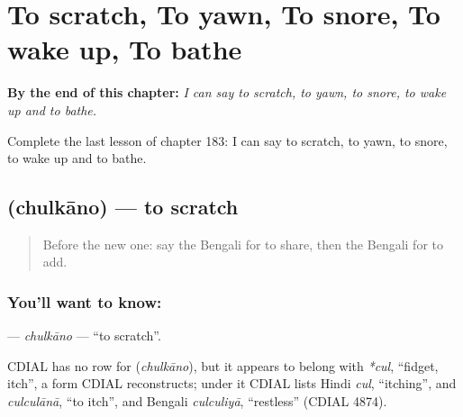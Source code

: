 
\chapter{To scratch, To yawn, To snore, To wake up, To bathe}
\label{ch:bn-to-scratch-to-yawn-to-snore-to-wake-up-to-bathe}

\begin{chapteropening}
\textbf{By the end of this chapter:} \emph{I can say to scratch, to yawn, to snore, to wake up and to bathe.}

Complete the last lesson of chapter 183: I can say to scratch, to yawn, to snore, to wake up and to bathe.
\end{chapteropening}

\section[\texorpdfstring{\bn{চুলকানো} (chulkāno)}{চুলকানো (chulkāno)}]{ (chulkāno) — to scratch}

\label{lesson:BN-C183-chulkano}



\begin{quote}
Before the new one: say the Bengali for to share, then the Bengali for to add.
\end{quote}

\subsection*{You'll want to know: }
\textbf{} — \emph{chulkāno} — \textquotedblleft{}to scratch\textquotedblright{}.

\begin{cousinweb}
CDIAL has no row for \textbf{} (\emph{chulkāno}), but it appears to belong with \emph{*cul}, \textquotedblleft{}fidget, itch\textquotedblright{}, a form CDIAL reconstructs; under it CDIAL lists Hindi \emph{cul}, \textquotedblleft{}itching\textquotedblright{}, and \emph{culculānā}, \textquotedblleft{}to itch\textquotedblright{}, and Bengali \emph{culculiyā}, \textquotedblleft{}restless\textquotedblright{} (CDIAL 4874).
\end{cousinweb}

